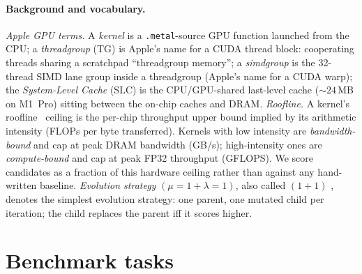 \documentclass{article}
\theoremstyle{plain}
\theoremstyle{definition}
\theoremstyle{remark}
\begin{document}
\paragraph{Background and vocabulary.}
\textit{Apple GPU terms.} A \emph{kernel} is a
\texttt{.metal}-source GPU function launched from the CPU; a
\emph{threadgroup} (TG) is Apple's name for a CUDA thread block:
cooperating threads sharing a scratchpad ``threadgroup memory''; a
\emph{simdgroup} is the 32-thread SIMD lane group inside a threadgroup
(Apple's name for a CUDA warp); the \emph{System-Level Cache} (SLC) is
the CPU/GPU-shared last-level cache (${\sim}24$\,MB on M1~Pro) sitting
between the on-chip caches and DRAM.
\textit{Roofline.} A kernel's roofline~\cite{williams2009roofline}
ceiling is the per-chip throughput upper bound implied by its arithmetic
intensity (FLOPs per byte transferred). Kernels with low intensity are
\emph{bandwidth-bound} and cap at peak DRAM bandwidth (GB/s);
high-intensity ones are \emph{compute-bound} and cap at peak FP32
throughput (GFLOPS). We score candidates as a fraction of this hardware
ceiling rather than against any hand-written baseline.
\textit{Evolution strategy} $(\mu{=}1{+}\lambda{=}1)$, also called
$(1{+}1)$ \cite{beyer2002evolution}, denotes the simplest evolution strategy: one parent, one
mutated child per iteration; the child replaces the parent iff it
scores higher.

\section{Benchmark tasks}
\label{sec:tasks}
\end{document}
